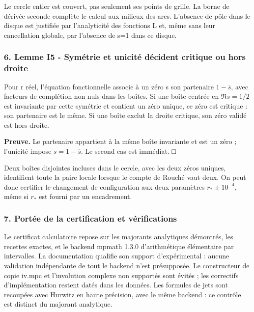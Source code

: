\documentclass[
  10pt,
  a4paper,
]{article}
\begin{document}
Le cercle entier est couvert, pas seulement ses points de grille. La
borne de dérivée seconde complète le calcul aux milieux des arcs.
L'absence de pôle dans le disque est justifiée par l'analyticité des
fonctions L et, même sans leur cancellation globale, par l'absence de
s=1 dans ce disque.

\hypertarget{lemme-i5---symuxe9trie-et-unicituxe9-duxe9cident-critique-ou-hors-droite}{%
\subsubsection{6. Lemme I5 - Symétrie et unicité décident critique ou
hors
droite}\label{lemme-i5---symuxe9trie-et-unicituxe9-duxe9cident-critique-ou-hors-droite}}

Pour r réel, l'équation fonctionnelle associe à un zéro s son partenaire
\(1-\overline s\), avec facteurs de complétion non nuls dans les boîtes.
Si une boîte centrée en \(\Re s=1/2\) est invariante par cette symétrie
et contient un zéro unique, ce zéro est critique : son partenaire est le
même. Si une boîte exclut la droite critique, son zéro validé est hors
droite.

\textbf{Preuve.} Le partenaire appartient à la même boîte invariante et
est un zéro ; l'unicité impose \(s=1-\overline s\). Le second cas est
immédiat. □

Deux boîtes disjointes incluses dans le cercle, avec les deux zéros
uniques, identifient toute la paire locale lorsque le compte de Rouché
vaut deux. On peut donc certifier le changement de configuration aux
deux paramètres \(r_*\pm10^{-4}\), même si \(r_*\) est fourni par un
encadrement.

\hypertarget{portuxe9e-de-la-certification-et-vuxe9rifications}{%
\subsubsection{7. Portée de la certification et
vérifications}\label{portuxe9e-de-la-certification-et-vuxe9rifications}}

Le certificat calculatoire repose sur les majorants analytiques
démontrés, les recettes exactes, et le backend mpmath 1.3.0
d'arithmétique élémentaire par intervalles. La documentation qualifie
son support d'expérimental : aucune validation indépendante de tout le
backend n'est présupposée. Le constructeur de copie iv.mpc et
l'involution complexe non supportés sont évités ; les correctifs
d'implémentation restent datés dans les données. Les formules de jets
sont recoupées avec Hurwitz en haute précision, avec le même backend :
ce contrôle est distinct du majorant analytique.
\end{document}
